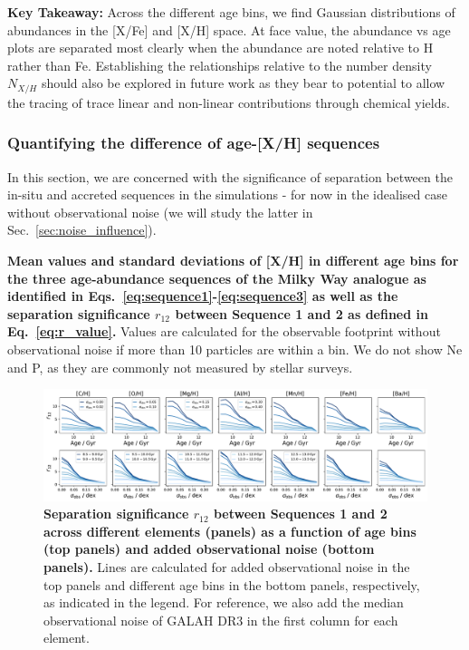 \documentclass[fleqn,usenatbib]{mnras}
\begin{document}
\textbf{Key Takeaway:} Across the different age bins, we find Gaussian distributions of abundances in the {[X/Fe]} and {[X/H]} space. At face value, the abundance vs age plots are separated most clearly when the abundance are noted relative to H rather than Fe. Establishing the relationships relative to the number density $N_{X/H}$ should also be explored in future work as they bear to potential to allow the tracing of trace linear and non-linear contributions through chemical yields.

\subsubsection{Quantifying the difference of age-{[X/H]} sequences}

In this section, we are concerned with the significance of separation between the in-situ and accreted sequences in the simulations - for now in the idealised case without observational noise (we will study the latter in Sec.~\ref{sec:noise_influence}).

\begin{table}
    \centering
    \caption{\textbf{Mean values and standard deviations of {[X/H]} in different age bins for the three age-abundance sequences of the Milky Way analogue as identified in Eqs.~\ref{eq:sequence1}-\ref{eq:sequence3} as well as the separation significance $r_{12}$ between Sequence 1 and 2 as defined in Eq.~\ref{eq:r_value}.} Values are calculated for the observable footprint without observational noise if more than 10 particles are within a bin. We do not show Ne and P, as they are commonly not measured by stellar surveys.}
    \tiny
    
    \label{tab:tabular_separation_r12}
\end{table}

\begin{figure}
	\includegraphics[width=\textwidth]{figures/r12_for_sigmaobs.pdf}
    \caption{
    \textbf{Separation significance $r_{12}$ between Sequences 1 and 2 across different elements (panels) as a function of age bins (top panels) and added observational noise (bottom panels).} Lines are calculated for added observational noise in the top panels and different age bins in the bottom panels, respectively, as indicated in the legend. For reference, we also add the median observational noise of GALAH DR3 in the first column for each element.}
    \label{fig:r12_for_sigmaobs}
\end{figure}
\end{document}
